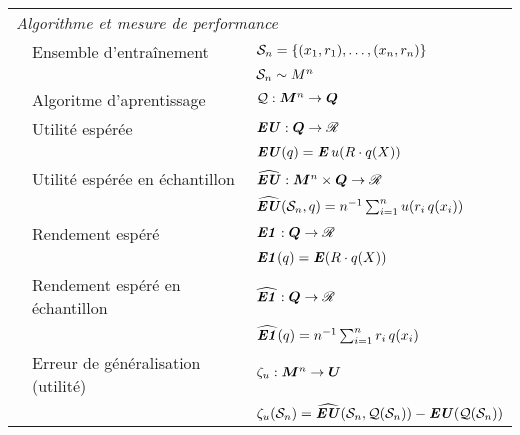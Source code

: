 \begin{table}[h!]
\begin{tabular}{@{}lll}
    \midrule
    \multicolumn{3}{l}{\textit{Algorithme et mesure de performance}}\\[1ex]
    &Ensemble d'entraînement & $\S_n = \{(x_1,r_1),\ldots,(x_n,r_n)\}$\\
    &               &$\S_n\sim M^n$\\[0.8ex]
    & Algoritme d'aprentissage & $\alg:\M^n\to\Q$\\[0.8ex]
    & Utilité espérée  & $\EU:\Q\to\Re$\\
    &       & $\EU(q) = \E u(R\cdot q(X))$\\[0.8ex]
    & Utilité espérée en échantillon & $\hEU:\M^n \times \Q \to \Re$\\
    &       &$\hEU(\S_n,q) = n^{-1}\sumi u(r_i\,q(x_i))$\\[0.8ex]
    & Rendement espéré & $\EN:\Q\to\Re$\\
    &                  & $\EN(q) = \E(R\cdot q(X))$\\[0.8ex]
    & Rendement espéré en échantillon & $\hEN:\Q\to\Re$\\
    && $\hEN(q) = n^{-1}\sumi r_i\,q(x_i)$\\[0.8ex]
    & Erreur de généralisation (utilité) & $\zeta_u:\M^n \to \Ut$\\
    && $\zeta_u(\S_n) = \hEU(\S_n,\alg(\S_n)) - \EU(\alg(\S_n))$\\
    \bottomrule
\end{tabular}
\end{table}

